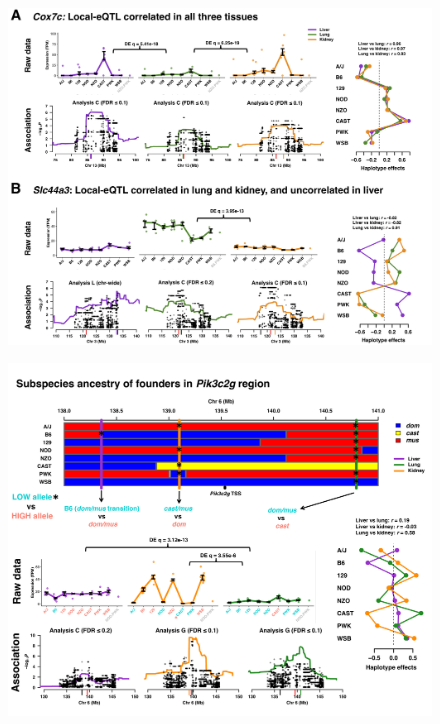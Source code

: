 \documentclass[10pt,letterpaper]{article}
\begin{document}
\begin{figure}[hp]
\includegraphics[width=\textwidth, trim={0in 0in 0in 0in}, clip]{figs/correlated_local_eqtl_update.png}
\caption{}
\end{figure}

\newpage

\begin{figure}[hp]
\includegraphics[width=\textwidth, trim={0in 0.5in 0in 0in}, clip]{figs/pik3c2g_example.pdf}
\caption{}
\end{figure}

\newpage
\end{document}
